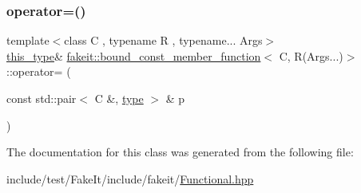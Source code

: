 \mbox{\label{classfakeit_1_1bound__const__member__function_3_01C_00_01R_07Args_8_8_8_08_4_af1f9cd08e67582f7a65f6afeb027937d}} 
\subsubsection{\texorpdfstring{operator=()}{operator=()}}
{\footnotesize\ttfamily template$<$class C , typename R , typename... Args$>$ \\
\mbox{\hyperlink{classfakeit_1_1bound__const__member__function_3_01C_00_01R_07Args_8_8_8_08_4_abd7a4a6a7f91724a7279dce10ce7941a}{this\+\_\+type}}\& \mbox{\hyperlink{classfakeit_1_1bound__const__member__function}{fakeit\+::bound\+\_\+const\+\_\+member\+\_\+function}}$<$ C, R(Args...)$>$\+::operator= (\begin{DoxyParamCaption}\item[{const std\+::pair$<$ C \&, \mbox{\hyperlink{classfakeit_1_1bound__const__member__function_3_01C_00_01R_07Args_8_8_8_08_4_a0226a7415039666838a9beafb0acc657}{type}} $>$ \&}]{p }\end{DoxyParamCaption})\hspace{0.3cm}{\ttfamily [inline]}}



The documentation for this class was generated from the following file\+:\begin{DoxyCompactItemize}
\item 
include/test/\+Fake\+It/include/fakeit/\mbox{\hyperlink{Functional_8hpp}{Functional.\+hpp}}\end{DoxyCompactItemize}

